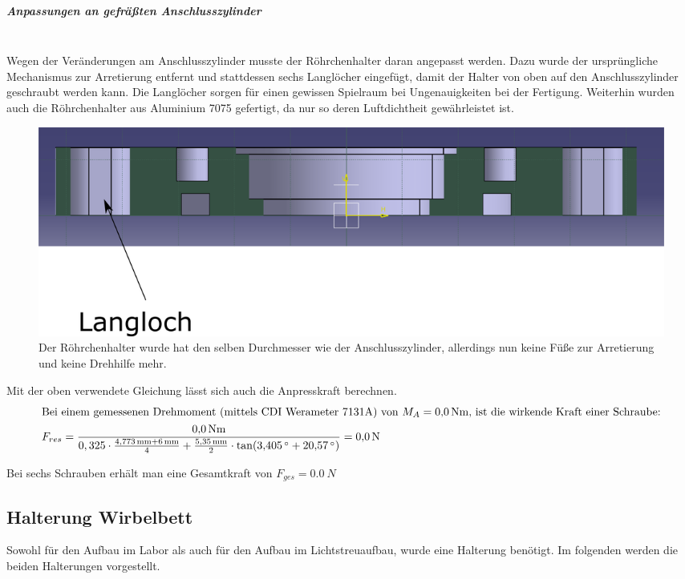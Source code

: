 \subparagraph{Anpassungen an gefräßten Anschlusszylinder}
\hfill \\

Wegen der Veränderungen am Anschlusszylinder musste der Röhrchenhalter daran angepasst werden. Dazu  wurde der ursprüngliche Mechanismus zur Arretierung entfernt und stattdessen sechs Langlöcher eingefügt, damit der Halter von oben auf den Anschlusszylinder geschraubt werden kann. Die Langlöcher sorgen für einen gewissen Spielraum bei Ungenauigkeiten bei der Fertigung. Weiterhin wurden auch die Röhrchenhalter aus Aluminium 7075 gefertigt, da nur so deren Luftdichtheit gewährleistet ist.

\begin{figure}[h!]
	\begin{center}
		\includegraphics[scale=0.6]{Schnitt_RoehrchenhalterV2.png}
		\caption[Röhrchenhalter V2]{Der Röhrchenhalter wurde hat den selben Durchmesser wie der Anschlusszylinder, allerdings nun keine Füße zur Arretierung und keine Drehhilfe mehr.}
	\end{center}
\end{figure}

Mit der oben verwendete Gleichung lässt sich auch die Anpresskraft berechnen.
\begin{align*}
	\intertext{Bei einem gemessenen Drehmoment (mittels CDI Werameter 7131A) von $M_A = \SI{0,0}{Nm}$, ist die wirkende Kraft einer Schraube:}
	F_{res} &= \frac{\SI{0,0}{Nm}}{0,325 \cdot \frac{\SI{4,773}{mm} + \SI{6}{mm}}{4} + \frac{\SI{5,35}{mm}}{2} \cdot \tan(\SI{3,405}{^\circ} + \SI{20,57}{^\circ})} = \SI{0,0}{N}
\end{align*}

Bei sechs Schrauben erhält man eine Gesamtkraft von $F_{ges} = \SI{0,0}{N}$



\subsection{Halterung Wirbelbett}

Sowohl für den Aufbau im Labor als auch für den Aufbau im Lichtstreuaufbau, wurde eine Halterung benötigt. Im folgenden werden die beiden Halterungen vorgestellt.

